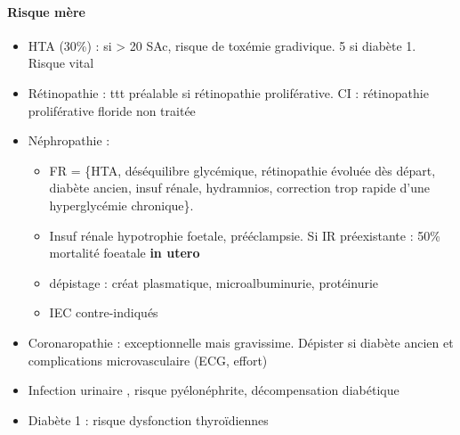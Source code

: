 \documentclass[11pt]{article}
\begin{document}
\paragraph{Risque mère}
\label{sec:org5ef72b3}
\begin{itemize}
\item HTA (30\%) : si > 20 SAc, risque de toxémie gradivique. \texttimes{}5 si
diabète 1. Risque vital \faBomb
\item Rétinopathie : ttt préalable si rétinopathie proliférative. CI : rétinopathie
proliférative floride non traitée
\item Néphropathie : 
\begin{itemize}
\item FR = \{HTA, déséquilibre glycémique, rétinopathie évoluée dès
départ, diabète ancien, insuf rénale, hydramnios, correction trop rapide d'une
hyperglycémie chronique\}.
\item Insuf rénale \thus hypotrophie foetale, prééclampsie. Si IR préexistante : 50\%
mortalité foeatale \textbf{in utero}
\item dépistage : créat plasmatique, microalbuminurie, protéinurie
\item IEC contre-indiqués
\end{itemize}
\item Coronaropathie : exceptionnelle mais gravissime. Dépister si diabète ancien et
complications microvasculaire (ECG, effort)
\item Infection urinaire \inc, risque pyélonéphrite, décompensation diabétique
\item Diabète 1 : \inc risque dysfonction thyroïdiennes
\end{itemize}
\end{document}
